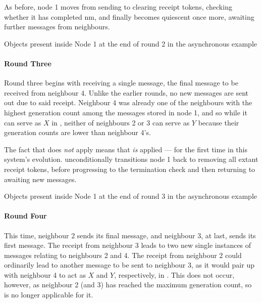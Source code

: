 As before, node 1 moves from sending to clearing receipt tokens, checking whether it has completed \gls{nm}, and finally becomes quiescent once more, awaiting further messages from neighbours.

\begin{cpobjectsfloat}
\begin{cpobjects}
\end{cpobjects}
\caption{\label{objs:nmp:ex2}Objects present inside Node 1 at the end of round 2 in the asynchronous  example}
\end{cpobjectsfloat}

\paragraph{Round Three}
Round three begins with receiving a single message, the final message to be received from neighbour 4.  Unlike the earlier rounds, no new messages are sent out due to said receipt.  Neighbour 4 was already one of the neighbours with the highest generation count among the messages stored in node 1, and so while it can serve as \(X\) in , neither of neighbours 2 or 3 can serve as \(Y\) because their generation counts are lower than neighbour 4's.

The fact that  does \emph{not} apply means that  \emph{is} applied --- for the first time in this system's evolution.   unconditionally transitions node 1 back to removing all extant receipt tokens, before progressing to the termination check and then returning to awaiting new messages.

\begin{cpobjectsfloat}
\begin{cpobjects}
\end{cpobjects}
\caption{\label{objs:nmp:ex3}Objects present inside Node 1 at the end of round 3 in the asynchronous  example}
\end{cpobjectsfloat}

\paragraph{Round Four}
This time, neighbour 2 sends its final message, and neighbour 3, at last, sends its first message.  The receipt from neighbour 3 leads to two new single instances of messages relating to neighbours 2 and 4.  The receipt from neighbour 2 could ordinarily lead to another message to be sent to neighbour 3, as it would pair up with neighbour 4 to act as \(X\) and \(Y\), respectively, in .  This does not occur, however, as neighbour 2 (and 3) has reached the maximum generation count, so  is no longer applicable for it.


